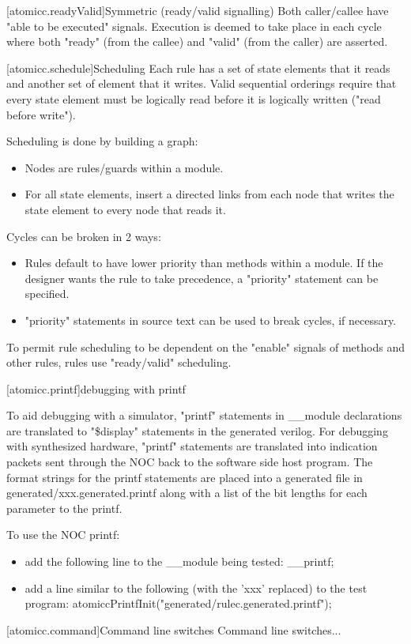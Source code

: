[atomicc.readyValid]{Symmetric (ready/valid signalling)}
Both caller/callee have "able to be executed" signals.  Execution is deemed to take
place in each cycle where both "ready" (from the callee) and "valid" (from the caller)
are asserted.

[atomicc.schedule]{Scheduling}
Each rule has a set of state elements that it reads and another set of element that it writes.
Valid sequential orderings require that every state element must be logically read before it is logically
written ("read before write").

Scheduling is done by building a graph:
\begin{itemize}
\item Nodes are rules/guards within a module.
\item For all state elements, insert a directed links from each node that writes the state element to every node that reads it.
\end{itemize}

Cycles can be broken in 2 ways:
\begin{itemize}
\item Rules default to have lower priority than methods within a module.  If the designer wants the rule to take precedence, a "priority" statement can be specified.
\item "priority" statements in source text can be used to break cycles, if necessary.
\end{itemize}

To permit rule scheduling to be dependent on the "enable" signals of methods and other rules, rules use "ready/valid" scheduling.

[atomicc.printf]{debugging with printf}

To aid debugging with a simulator, "printf" statements in __module declarations are
translated to "\$display" statements in the generated verilog.
For debugging with synthesized hardware, "printf" statements are translated into
indication packets sent through the NOC back to the software side host program.
The format strings for the printf statements are placed into a generated file
in generated/xxx.generated.printf along with a list of the bit lengths for each
parameter to the printf.

To use the NOC printf:
\begin{itemize}
\item add the following line to the __module being tested: __printf;
\item add a line similar to the following (with the 'xxx' replaced) to the test program:
           atomiccPrintfInit("generated/rulec.generated.printf");
\end{itemize}

[atomicc.command]{Command line switches}
Command line switches...
